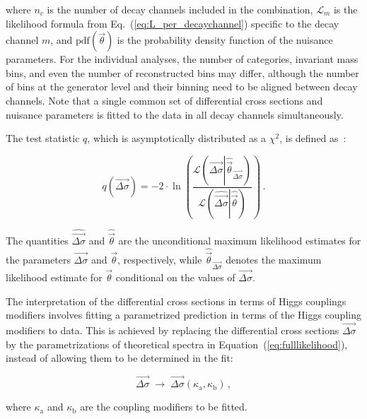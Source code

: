 % 
where $n_c$ is the number of decay channels included in the combination, $\mathcal{L}_m$ is the likelihood formula from Eq.~(\ref{eq:L_per_decaychannel}) specific to the decay channel $m$, and $\text{pdf}(\vec{\theta})$ is the probability density function of the nuisance parameters.
% 
For the individual analyses, the number of categories, invariant mass bins, and even the number of reconstructed bins may differ, although the number of bins at the generator level and their binning need to be aligned between decay channels.
% 
Note that a single common set of differential cross sections and nuisance parameters is fitted to the data in all decay channels simultaneously.


The test statistic $q$, which is asymptotically distributed as a $\chi^2$, is defined as~\cite{Cowan:2010js}:
% 
\begin{linenomath*}
\begin{equation}
q(\vec{\Delta\sigma}) = -2 \cdot \ln \left(
    \frac{
        \mathcal{L}
            \left(
            \vec{\Delta\sigma} \left| \hat{\vec{\theta}}_{\vec{\Delta\sigma}}
            \right)\right.
        }{
        \mathcal{L}
            \left(
            \hat{\vec{\Delta\sigma}} \left| \hat{\vec{\theta}}
            \right)\right.
        }
\right)
\,.
\label{eq:TestStatisticQ}
\end{equation}
\end{linenomath*}
% 
The quantities $\hat{\vec{\Delta\sigma}}$ and $\hat{\vec{\theta}}$ are the unconditional maximum likelihood estimates for the parameters $\vec{\Delta\sigma}$ and $\vec{\theta}$, respectively, while $\hat{\vec{\theta}}_{\vec{\Delta\sigma}}$ denotes the maximum likelihood estimate for $\vec{\theta}$ conditional on the values of $\vec{\Delta\sigma}$.


The interpretation of the differential cross sections in terms of Higgs couplings modifiers involves fitting a parametrized prediction in terms of the Higgs coupling modifiers to data.
% 
This is achieved by replacing the differential cross sections $\vec{\Delta\sigma}$ by the parametrizations of theoretical spectra in Equation~(\ref{eq:fulllikelihood}), instead of allowing them to be determined in the fit:
% 
\begin{linenomath*}
\begin{equation}
\label{eq:likelihood-interpretation}
    \vec{\Delta\sigma} \; \to \; \vec{\Delta\sigma}( \kappa_\text{a}, \kappa_\text{b} )
    \,,
\end{equation}
\end{linenomath*}
% 
where $\kappa_\text{a}$ and $\kappa_\text{b}$ are the coupling modifiers to be fitted.


